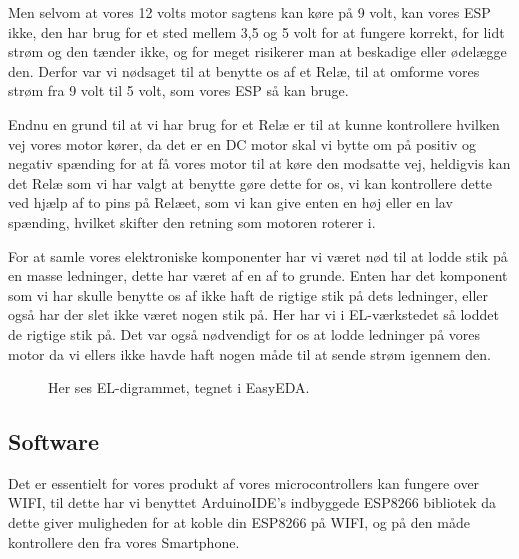 \documentclass[11pt]{article}
\begin{document}
Men selvom at vores 12 volts motor sagtens kan køre på 9 volt, kan vores ESP ikke, den har brug for et sted mellem 3,5 og 5 volt for at fungere korrekt, for lidt strøm og den tænder ikke, og for meget risikerer man at beskadige eller ødelægge den. Derfor var vi nødsaget til at benytte os af et Relæ, til at omforme vores strøm fra 9 volt til 5 volt, som vores ESP så kan bruge.

Endnu en grund til at vi har brug for et Relæ er til at kunne kontrollere hvilken vej vores motor kører, da det er en DC motor skal vi bytte om på positiv og negativ spænding for at få vores motor til at køre den modsatte vej, heldigvis kan det Relæ som vi har valgt at benytte gøre dette for os, vi kan kontrollere dette ved hjælp af to pins på Relæet, som vi kan give enten en høj eller en lav spænding, hvilket skifter den retning som motoren roterer i.

For at samle vores elektroniske komponenter har vi været nød til at lodde stik på en masse ledninger, dette har været af en af to grunde. Enten har det komponent som vi har skulle benytte os af ikke haft de rigtige stik på dets ledninger, eller også har der slet ikke været nogen stik på. Her har vi i EL-værkstedet så loddet de rigtige stik på. Det var også nødvendigt for os at lodde ledninger på vores motor da vi ellers ikke havde haft nogen måde til at sende strøm igennem den.

\begin{figure}[htbp]
    \centering
    \caption{Her ses EL-digrammet, tegnet i EasyEDA. }
    \end{figure}

\subsection{Software}
Det er essentielt for vores produkt af vores microcontrollers kan fungere over WIFI, til dette har vi benyttet ArduinoIDE's indbyggede ESP8266 bibliotek da dette giver muligheden for at koble din ESP8266 på WIFI, og på den måde kontrollere den fra vores Smartphone. 
\end{document}
